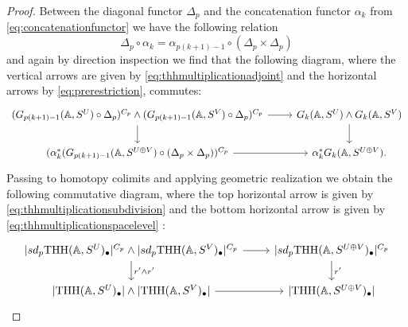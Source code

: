 \begin{proof}
Between
the diagonal functor $\Delta_p$ and the concatenation functor $\alpha_k$
from \eqref{eq:concatenationfunctor} we have the following relation
\[
\Delta_p\circ \alpha_k = \alpha_{p(k+1) - 1}\circ (\Delta_p\times \Delta_p)
\]
and again by direction inspection we find that the following diagram, where the vertical arrows
are given by \eqref{eq:thhmultiplicationadjoint} and the horizontal arrows by
\eqref{eq:prerestriction}, commutes:
\[
\begin{tikzcd}
(G_{p(k+1) - 1}(\A, S^U)\circ \Delta_p)^{C_p}\wedge (G_{p(k+1) - 1}(\A, S^V)\circ \Delta_p)^{C_p}
\arrow{d}\arrow{r}
& G_{k}(\A, S^U)\wedge G_{k}(\A, S^V)
\arrow{d}\\
(\alpha_k^\ast (G_{p(k+1) - 1}(\A, S^{U\oplus V})\circ (\Delta_p\times \Delta_p))^{C_p}
\arrow{r}
&\alpha^\ast_k G_{k}(\A, S^{U\oplus V}).
\end{tikzcd}
%
%
\]
Passing to homotopy colimits and applying geometric realization we obtain the following
commutative diagram, where the top horizontal arrow is given by
\eqref{eq:thhmultiplicationsubdivision} and the bottom horizontal arrow is given by \eqref{eq:thhmultiplicationspacelevel} :
\begin{equation}\label{eq:restrictionmultiplication2}
\begin{tikzcd}
\lvert sd_p\mathrm{THH}(\A,S^U)_\bullet\rvert ^{C_p}\wedge \lvert sd_p\mathrm{THH}(\A,S^V)_\bullet\rvert ^{C_p}
\arrow{r}\arrow{d}{r'\wedge r'}
&\lvert sd_p\mathrm{THH}(\A,S^{U\oplus V})_\bullet\rvert ^{C_p}
\arrow{d}{r'}\\
\lvert \mathrm{THH}(\A,S^U)_\bullet\rvert \wedge \lvert \mathrm{THH}(\A,S^V)_\bullet\rvert 
\arrow{r}
&\lvert \mathrm{THH}(\A,S^{U\oplus V})_\bullet\rvert 
\end{tikzcd}

\end{equation}
\end{proof}
